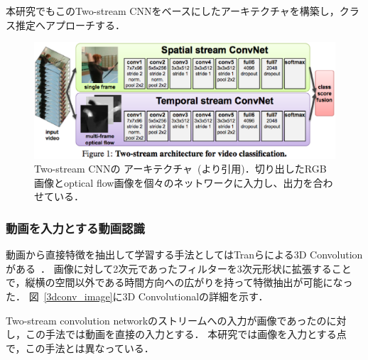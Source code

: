 本研究でもこのTwo-stream CNNをベースにしたアーキテクチャを構築し，クラス推定へアプローチする．
\begin{figure}[htbp]
 \begin{center}
  \includegraphics[width=12cm]{./Figures/two-stream.eps}
  \caption{Two-stream CNNの アーキテクチャ~(\cite{simonyan2014two}より引用)．切り出したRGB画像とoptical flow画像を個々のネットワークに入力し、出力を合わせている．}
  \label{2st_network}
 \end{center}
\end{figure}

\subsubsection{動画を入力とする動画認識}
動画から直接特徴を抽出して学習する手法としてはTranらによる3D Convolution がある~\cite{tran14}．
画像に対して2次元であったフィルターを3次元形状に拡張することで，縦横の空間以外である時間方向への広がりを持って特徴抽出が可能になった．
図~\ref{3dconv_image}に3D Convolutionalの詳細を示す．

Two-stream convolution networkのストリームへの入力が画像であったのに対し，この手法では動画を直接の入力とする．
本研究では画像を入力とする点で，この手法とは異なっている．

